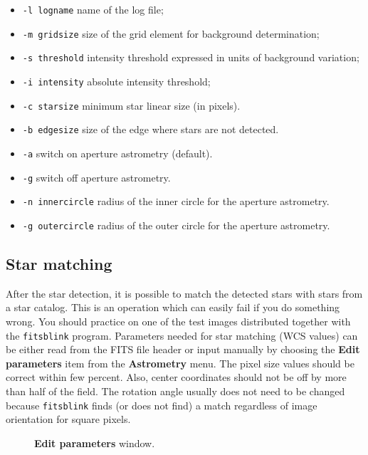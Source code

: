 \documentclass[11pt]{article}
\begin{document}
\begin{itemize}
\item \verb=-l logname=  name of the log file;
\item \verb=-m gridsize= size of the grid element for background determination;
\item \verb=-s threshold= intensity threshold expressed in units of
background variation;
\item \verb=-i intensity= absolute intensity threshold;
\item \verb=-c starsize= minimum star linear size (in pixels).
\item \verb=-b edgesize= size of the edge where stars are not detected.
\item \verb=-a= switch on aperture astrometry (default).
\item \verb=-g= switch off aperture astrometry.
\item \verb=-n innercircle= radius of the inner circle for the
aperture astrometry.
\item \verb=-g outercircle= radius of the outer circle for the
aperture astrometry.
\end{itemize}

\subsection{Star matching}
\label{starmatch}

After the star detection, it is possible to match the detected stars
with stars from a star catalog.  This is an operation which can easily
fail if you do something wrong.  You should practice on one of the
test images distributed together with the \verb=fitsblink= program.
Parameters needed for star matching (WCS values) can be either read
from the FITS file header or input manually by choosing the
\textbf{Edit parameters} item from the \textbf{Astrometry} menu.  The
pixel size values should be correct within few percent.  Also, center
coordinates should not be off by more than half of the field.  The
rotation angle usually does not need to be changed because
\verb=fitsblink= finds (or does not find) a match regardless of image
orientation for square pixels.

\begin{figure}
\begin{center}
\epsfxsize=8cm
\caption{\textbf{Edit parameters} window.}
\label{parameters}
\end{center}
\end{figure}
\end{document}
